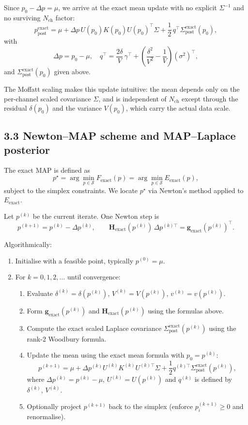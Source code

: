 \documentclass[11pt]{article}
\begin{document}
Since $p_0 - \Delta p = \mu$, we arrive at the exact mean update with
no explicit $\Sigma^{-1}$ and no surviving $N_{\text{ch}}$ factor:
\[
  \boxed{
  p_{\text{post}}^{\text{exact}}
  =
  \mu
  + \Delta p\,U(p_0)K(p_0)U(p_0)^\top\Sigma
  + \frac{1}{2}\,q^\top
    \Sigma_{\text{post}}^{\text{exact}}(p_0),
  }
\]
with
\[
  \Delta p = p_0 - \mu,
  \quad
  q^\top
  =
  \frac{2\delta}{V}\,\gamma^\top
  +
  \left(\frac{\delta^2}{V^2} - \frac{1}{V}\right)(\sigma^2)^\top,
\]
and $\Sigma_{\text{post}}^{\text{exact}}(p_0)$ given above.

The Moffatt scaling makes this update intuitive: the mean depends only
on the per-channel scaled covariance $\Sigma$, and is independent of
$N_{\text{ch}}$ except through the residual $\delta(p_0)$ and the
variance $V(p_0)$, which carry the actual data scale.

\subsection*{3.3 Newton--MAP scheme and MAP--Laplace posterior}

The exact MAP is defined as
\[
  p^\star = \arg\min_{p\in\mathcal{S}} F_{\text{exact}}(p)
  = \arg\min_{p\in\mathcal{S}} E_{\text{exact}}(p),
\]
subject to the simplex constraints.  We locate $p^\star$ via Newton's
method applied to $E_{\text{exact}}$.

Let $p^{(k)}$ be the current iterate.  One Newton step is
\[
  p^{(k+1)} = p^{(k)} - \Delta p^{(k)},
  \qquad
  \mathbf{H}_{\text{exact}}(p^{(k)})\,\Delta p^{(k)\top}
  = \mathbf{g}_{\text{exact}}(p^{(k)})^\top.
\]

Algorithmically:
\begin{enumerate}
  \item Initialise with a feasible point, typically $p^{(0)} = \mu$.
  \item For $k=0,1,2,\dots$ until convergence:
  \begin{enumerate}
    \item Evaluate
      $\delta^{(k)} = \delta(p^{(k)})$,
      $V^{(k)} = V(p^{(k)})$,
      $v^{(k)} = v(p^{(k)})$.
    \item Form
      $\mathbf{g}_{\text{exact}}(p^{(k)})$ and
      $\mathbf{H}_{\text{exact}}(p^{(k)})$ using the formulas above.
    \item Compute the exact scaled Laplace covariance
      $\Sigma_{\text{post}}^{\text{exact}}(p^{(k)})$
      using the rank-2 Woodbury formula.
    \item Update the mean using the exact mean formula with
      $p_0 = p^{(k)}$:
      \[
        p^{(k+1)}
        =
        \mu
        + \Delta p^{(k)} U^{(k)}K^{(k)}U^{(k)\top}\Sigma
        + \frac{1}{2}q^{(k)\top}
          \Sigma_{\text{post}}^{\text{exact}}(p^{(k)}),
      \]
      where $\Delta p^{(k)} = p^{(k)} - \mu$,
      $U^{(k)} = U(p^{(k)})$ and
      $q^{(k)}$ is defined by $\delta^{(k)}$, $V^{(k)}$.
    \item Optionally project $p^{(k+1)}$ back to the simplex
      (enforce $p_i^{(k+1)}\ge 0$ and renormalise).
  \end{enumerate}
\end{enumerate}
\end{document}

